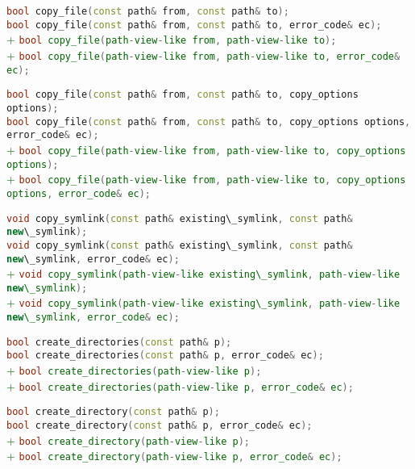 \documentclass[11pt]{article}
\newcommand{\code}[2][cpp]{\lstinline[language=#1,basicstyle=\small\ttfamily]{#2}}
\newcommand{\tsreplace}[3]{\textcolor{red}{\sout{#1}}#2\textcolor{darkgreen}{#3}}
\begin{document}
\tsreplace{}{  \code{bool copy_file(const path& from, const path& to);}}{}\\
\tsreplace{}{  \code{bool copy_file(const path& from, const path& to, error_code& ec);}}{}\\
\tsreplace{}{}{+ \code{bool copy_file(path-view-like from, path-view-like to);}}\\
\tsreplace{}{}{+ \code{bool copy_file(path-view-like from, path-view-like to, error_code& ec);}}

\tsreplace{}{  \code{bool copy_file(const path& from, const path& to, copy_options options);}}{}\\
\tsreplace{}{  \code{bool copy_file(const path& from, const path& to, copy_options options, error_code& ec);}}{}\\
\tsreplace{}{}{+ \code{bool copy_file(path-view-like from, path-view-like to, copy_options options);}}\\
\tsreplace{}{}{+ \code{bool copy_file(path-view-like from, path-view-like to, copy_options options, error_code& ec);}}

\tsreplace{}{  \code{void copy_symlink(const path& existing\_symlink, const path& new\_symlink);}}{}\\
\tsreplace{}{  \code{void copy_symlink(const path& existing\_symlink, const path& new\_symlink, error_code& ec);}}{}\\
\tsreplace{}{}{+ \code{void copy_symlink(path-view-like existing\_symlink, path-view-like new\_symlink);}}\\
\tsreplace{}{}{+ \code{void copy_symlink(path-view-like existing\_symlink, path-view-like new\_symlink, error_code& ec);}}

\tsreplace{}{  \code{bool create_directories(const path& p);}}{}\\
\tsreplace{}{  \code{bool create_directories(const path& p, error_code& ec);}}{}\\
\tsreplace{}{}{+ \code{bool create_directories(path-view-like p);}}\\
\tsreplace{}{}{+ \code{bool create_directories(path-view-like p, error_code& ec);}}

\tsreplace{}{  \code{bool create_directory(const path& p);}}{}\\
\tsreplace{}{  \code{bool create_directory(const path& p, error_code& ec);}}{}\\
\tsreplace{}{}{+ \code{bool create_directory(path-view-like p);}}\\
\tsreplace{}{}{+ \code{bool create_directory(path-view-like p, error_code& ec);}}
\end{document}
